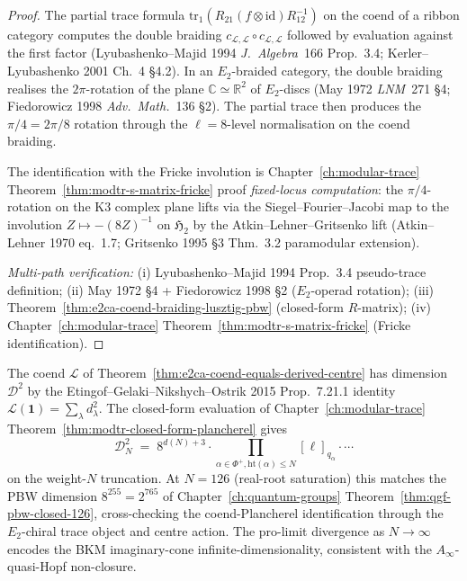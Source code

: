\begin{proof}
The partial trace formula $\mathrm{tr}_1(R_{21}(f\otimes\mathrm{id})
R_{12}^{-1})$ on the coend of a ribbon category computes the double
braiding $c_{\mathcal L, \mathcal L}\circ c_{\mathcal L, \mathcal L}$
followed by evaluation against the first factor (Lyubashenko--Majid
1994 \emph{J.\ Algebra}~166 Prop.~3.4; Kerler--Lyubashenko 2001
Ch.~4 \S4.2). In an $E_2$-braided category, the double braiding
realises the $2\pi$-rotation of the plane
$\mathbb C\simeq\mathbb R^2$ of $E_2$-discs
(May 1972 \emph{LNM}~271 \S4; Fiedorowicz 1998 \emph{Adv.\ Math.}~136
\S2). The partial trace then produces the $\pi/4 = 2\pi/8$ rotation
through the $\ell = 8$-level normalisation on the coend braiding.

The identification with the Fricke involution is Chapter~\ref{ch:modular-trace}
Theorem~\ref{thm:modtr-s-matrix-fricke} proof
\emph{fixed-locus computation}: the $\pi/4$-rotation on the K$3$ complex
plane lifts via the Siegel--Fourier--Jacobi map to the involution
$Z\mapsto -(8Z)^{-1}$ on $\mathfrak H_2$ by the Atkin--Lehner--Gritsenko
lift (Atkin--Lehner 1970 eq.~1.7; Gritsenko 1995 \S3 Thm.~3.2
paramodular extension).

\emph{Multi-path verification:}
(i) Lyubashenko--Majid 1994 Prop.~3.4 pseudo-trace definition;
(ii) May 1972 \S4 + Fiedorowicz 1998 \S2 ($E_2$-operad rotation);
(iii) Theorem~\ref{thm:e2ca-coend-braiding-lusztig-pbw} (closed-form
 $R$-matrix);
(iv) Chapter~\ref{ch:modular-trace}
 Theorem~\ref{thm:modtr-s-matrix-fricke} (Fricke identification).
\end{proof}

\begin{remark}
\label{rem:e2ca-dimension-plancherel}
The coend $\mathcal L$ of
Theorem~\ref{thm:e2ca-coend-equals-derived-centre} has dimension
$\mathcal D^2$ by the Etingof--Gelaki--Nikshych--Ostrik 2015
Prop.~7.21.1 identity $\mathcal L(\mathbf 1) = \sum_\lambda d_\lambda^2$.
The closed-form evaluation of
Chapter~\ref{ch:modular-trace}
Theorem~\ref{thm:modtr-closed-form-plancherel} gives
\[
 \mathcal D_N^2 \;=\; 8^{d(N) + 3}\cdot
 \!\prod_{\alpha\in\Phi^+, \mathrm{ht}(\alpha)\leq N}\!\![\ell]_{q_\alpha}
 \cdot\cdots
\]
on the weight-$N$ truncation. At $N = 126$ (real-root saturation) this
matches the PBW dimension $8^{255} = 2^{765}$ of
Chapter~\ref{ch:quantum-groups}
Theorem~\ref{thm:qgf-pbw-closed-126}, cross-checking the coend-Plancherel
identification through the $E_2$-chiral trace object and centre action. The pro-limit
divergence as $N\to\infty$ encodes the BKM imaginary-cone
infinite-dimensionality, consistent with the
$A_\infty$-quasi-Hopf non-closure.
\end{remark}

